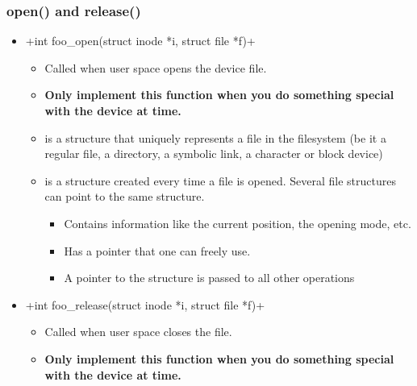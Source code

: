 \begin{frame}[fragile]
  \frametitle{open() and release()}
  \begin{itemize}
  \item {}+int foo_open(struct inode *i, struct file *f)+
    \begin{itemize}
    \item Called when user space opens the device file.
    \item {\bf Only implement this function when you do something
          special with the device at  time.}
    \item {} is a structure that uniquely represents a file
      in the filesystem (be it a regular file, a directory, a symbolic
      link, a character or block device)
    \item {} is a structure created every time a file is
      opened. Several file structures can point to the same
       structure.
      \begin{itemize}
      \item Contains information like the current position, the
        opening mode, etc.
      \item Has a  pointer that one can
        freely use.
      \item A pointer to the  structure is passed to all other
        operations
      \end{itemize}
    \end{itemize}
  \item {}+int foo_release(struct inode *i, struct file *f)+
    \begin{itemize}
    \item Called when user space closes the file.
    \item {\bf Only implement this function when you do something
          special with the device at  time.}
    \end{itemize}
  \end{itemize}
\end{frame}

